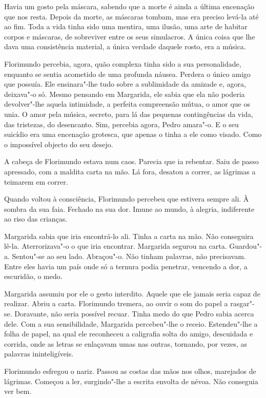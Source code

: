 Havia um gosto pela máscara, sabendo que a morte é ainda a última
encenação que nos resta. Depois da morte, as máscaras tombam, mas era
preciso levá-la até ao fim. Toda a vida tinha sido uma mentira, uma
ilusão, uma arte de habitar corpos e máscaras, de sobreviver entre os
seus simulacros. A única coisa que lhe dava uma consistência material, a
única verdade daquele rosto, era a música.

Florimundo percebia, agora, quão complexa tinha sido a sua
personalidade, enquanto se sentia acometido de uma profunda náusea.
Perdera o único amigo que possuía. Ele ensinara"-lhe tudo sobre a
sublimidade da amizade e, agora, deixava"-o só. Mesmo pensando em
Margarida, ele sabia que ela não poderia devolver"-lhe aquela intimidade,
a perfeita compreensão mútua, o amor que os unia. O amor pela música,
secreto, para lá das pequenas contingências da vida, das tristezas, do
desencanto. Sim, percebia agora, Pedro amara"-o. E o seu suicídio era uma
encenação grotesca, que apenas o tinha a ele como visado. Como o
impossível objecto do seu desejo.

A cabeça de Florimundo estava num caos. Parecia que ia rebentar. Saiu de
passo apressado, com a maldita carta na mão. Lá fora, desatou a correr,
as lágrimas a teimarem em correr.

Quando voltou à consciência, Florimundo percebeu que estivera sempre
ali. À sombra da sua faia. Fechado na sua dor. Imune ao mundo, à
alegria, indiferente ao riso das crianças.

Margarida sabia que iria encontrá-lo ali. Tinha a carta na mão. Não
conseguira lê-la. Aterrorizava"-o o que iria encontrar. Margarida segurou
na carta. Guardou"-a. Sentou"-se ao seu lado. Abraçou"-o. Não tinham
palavras, não precisavam. Entre eles havia um país onde só a ternura
podia penetrar, vencendo a dor, a escuridão, o medo.

Margarida assumiu por ele o gesto interdito. Aquele que ele jamais seria
capaz de realizar. Abriu a carta. Florimundo tremera, ao ouvir o som do
papel a rasgar"-se. Doravante, não seria possível recuar. Tinha medo do
que Pedro sabia acerca dele. Com a sua sensibilidade, Margarida
percebeu"-lhe o receio. Estendeu"-lhe a folha de papel, na qual ele
reconheceu a caligrafia solta do amigo, descuidada e corrida, onde as
letras se enlaçavam umas nas outras, tornando, por vezes, as palavras
ininteligíveis.

Florimundo esfregou o nariz. Passou as costas das mãos nos olhos,
marejados de lágrimas. Começou a ler, surgindo"-lhe a escrita envolta de
névoa. Não conseguia ver bem.

